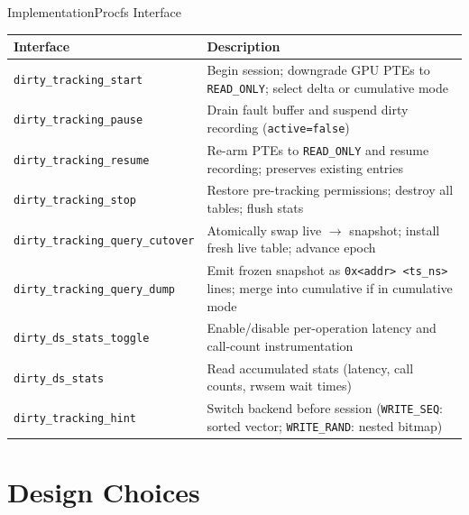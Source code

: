 \begin{frame}{Implementation}{Procfs Interface}
\begin{center}
\renewcommand{\arraystretch}{1.25}
\footnotesize
\begin{tabular}{l p{95mm}}
\toprule
\textbf{Interface} & \textbf{Description} \\
\midrule
\texttt{dirty\_tracking\_start}          & Begin session; downgrade GPU PTEs to \texttt{READ\_ONLY}; select delta or cumulative mode \\
\texttt{dirty\_tracking\_pause}          & Drain fault buffer and suspend dirty recording (\texttt{active=false}) \\
\texttt{dirty\_tracking\_resume}         & Re-arm PTEs to \texttt{READ\_ONLY} and resume recording; preserves existing entries \\
\texttt{dirty\_tracking\_stop}           & Restore pre-tracking permissions; destroy all tables; flush stats \\
\texttt{dirty\_tracking\_query\_cutover} & Atomically swap live $\to$ snapshot; install fresh live table; advance epoch \\
\texttt{dirty\_tracking\_query\_dump}    & Emit frozen snapshot as \texttt{0x<addr> <ts\_ns>} lines; merge into cumulative if in cumulative mode \\
\texttt{dirty\_ds\_stats\_toggle}        & Enable/disable per-operation latency and call-count instrumentation \\
\texttt{dirty\_ds\_stats}               & Read accumulated stats (latency, call counts, rwsem wait times) \\
\texttt{dirty\_tracking\_hint}           & Switch backend before session (\texttt{WRITE\_SEQ}: sorted vector; \texttt{WRITE\_RAND}: nested bitmap) \\
\bottomrule
\end{tabular}
\end{center}
\end{frame}

\section{Design Choices}

